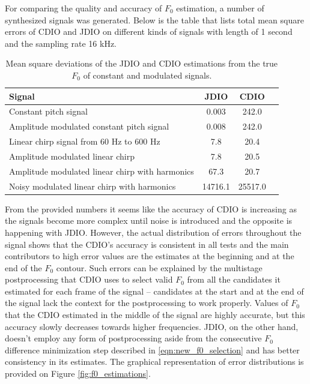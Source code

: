 \documentclass[a4paper]{article}
\begin{document}
For comparing the quality and accuracy of $F_0$ estimation, a number of synthesized signals was generated. Below is the table that lists total mean square errors of CDIO and JDIO on different kinds of signals with length of 1 second and the sampling rate 16 kHz.

\begin{table}[h]
    
    \begin{tabular*}{\textwidth}{@{\extracolsep{\fill}}lccl@{}}
        \hline
        Signal & JDIO & CDIO \\
        \hline
        Constant pitch signal & 0.003 & 242.0 \\
        Amplitude modulated constant pitch signal & 0.008 & 242.0 \\
        Linear chirp signal from 60 Hz to 600 Hz & 7.8 & 20.4 \\
        Amplitude modulated linear chirp & 7.8 & 20.5 \\
        Amplitude modulated linear chirp with harmonics & 67.3 & 20.7 \\
        Noisy modulated linear chirp with harmonics & 14716.1 & 25517.0 \\
        \hline
    \end{tabular*}

    \caption{Mean square deviations of the JDIO and CDIO estimations from the true $F_0$ of constant and modulated signals.}
\end{table}

From the provided numbers it seems like the accuracy of CDIO is increasing as the signals become more complex until noise is introduced and the opposite is happening with JDIO. However, the actual distribution of errors throughout the signal shows that the CDIO's accuracy is consistent in all tests and the main contributors to high error values are the estimates at the beginning and at the end of the $F_0$ contour. Such errors can be explained by the multistage postprocessing that CDIO uses to select valid $F_0$ from all the candidates it estimated for each frame of the signal -- candidates at the start and at the end of the signal lack the context for the postprocessing to work properly. Values of $F_0$ that the CDIO estimated in the middle of the signal are highly accurate, but this accuracy slowly decreases towards higher frequencies. JDIO, on the other hand, doesn't employ any form of postprocessing aside from the consecutive $F_0$ difference minimization step described in \eqref{eqn:new_f0_selection} and has better consistency in its estimates. The graphical representation of error distributions is provided on Figure \ref{fig:f0_estimations}.
\end{document}
